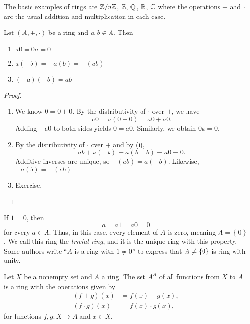 \documentclass[11pt,a4paper]{article}
\begin{document}


%



\begin{exa}
    The basic examples of rings are \(\mathbb{Z}/n\mathbb{Z}\), $\mathbb{Z}$, $\mathbb{Q}$, $\mathbb{R}$, $\mathbb{C}$ where the operations $+$ and $\cdot$ are the usual addition and multiplication in each case.
\end{exa}
 
\begin{teo}
Let $(A,+,\cdot)$ be a ring and
$a,b \in A$. Then 
\begin{enumerate}[label=(\roman*)]
    \item \(a 0 = 0 a = 0\)
    \item \(a (-b) = -a (b) = -(a b)\)
    \item \((-a)(-b) = a b\)
\end{enumerate}
\end{teo} 

\begin{proof}
\begin{enumerate}[label=(\roman*)]
    \item We know \(0 = 0 + 0\). By the distributivity of \(\cdot\) over \(+\), we have  
    \[
    a 0=a (0+0)=a 0+a 0.
    \]
    Adding \(-a0\) to both sides yields \(0=a0\). 
    Similarly, we obtain \(0a=0\). 
\item By the distributivity of \(\cdot\) over \(+\) and by (i), 
    \[a b+a(-b)=a (b-b) = a0=0.\]
    Additive inverses are unique, so \(-(a b)=a (-b)\). 
    Likewise, \(-a (b)=-(a b).\)
    \item Exercise.
\end{enumerate}
\end{proof}

\begin{rem}
    If \(1 = 0\), then \[a = a 1 = a 0 = 0\] for every \(a\in A\).
    Thus, in this case, every element of \(A\) is zero, meaning \(A = \left\{ 0 \right\}\).
    We call this ring the \textit{trivial ring}, and it is the unique ring with this property.
    Some authors write ``$A$ is a ring with $1\neq 0$'' to express that $A\neq \left\lbrace 0 \right\rbrace$ is ring with unity.
\end{rem}

\begin{exa}
Let \(X\) be a nonempty set and \(A\) a ring. 
The set \(A^X\) of all functions from \(X\) to  $A$ is  a ring with the operations given by
\begin{align*}
(f+g)(x) &= f(x)+g(x), \\
(f\cdot g)(x) &= f(x)\cdot g(x), 
\end{align*}
for functions \(f,g\colon X\to A\) and \(x\in X\). 
\end{exa}
\end{document}
